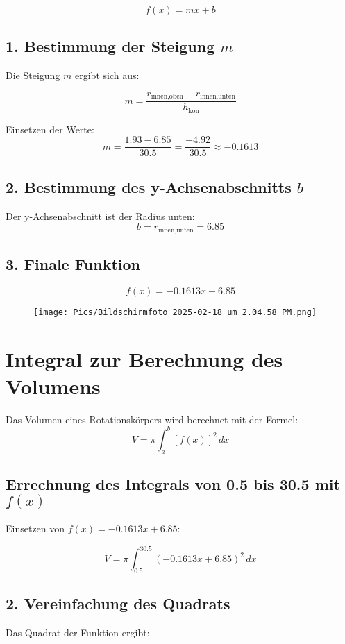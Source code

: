 \documentclass[a4paper,final]{report}
\begin{document}
\[
f(x) = m x + b
\]

\subsection{1. Bestimmung der Steigung \( m \)}
Die Steigung \( m \) ergibt sich aus:

\[
m = \frac{r_{\text{innen,oben}} - r_{\text{innen,unten}}}{h_{\text{kon}}}
\]

Einsetzen der Werte:
\[
m = \frac{1.93 - 6.85}{30.5} = \frac{-4.92}{30.5} \approx -0.1613
\]

\subsection{2. Bestimmung des y-Achsenabschnitts \( b \)}
Der y-Achsenabschnitt ist der Radius unten:
\[
b = r_{\text{innen,unten}} = 6.85
\]

\subsection{3. Finale Funktion}

\[
f(x) = -0.1613 x + 6.85
\]

\begin{figure}[h]
    \centering
    \texttt{[image: Pics/Bildschirmfoto 2025-02-18 um 2.04.58 PM.png]}
\end{figure}

\section{Integral zur Berechnung des Volumens}

Das Volumen eines Rotationskörpers wird berechnet mit der Formel:
\[
V = \pi \int_a^b [f(x)]^2 \, dx
\]

\subsection{Errechnung des Integrals von 0.5 bis 30.5 mit \( f(x) \)}
Einsetzen von \( f(x) = -0.1613x + 6.85 \):

\[
V = \pi \int_{0.5}^{30.5} \left(-0.1613x + 6.85\right)^2 \, dx
\]

\subsection{2. Vereinfachung des Quadrats}
Das Quadrat der Funktion ergibt:
\end{document}
